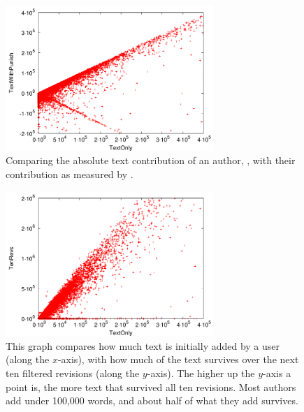 \begin{figure}[tbhp]
    \begin{center}
    \includegraphics[width=0.70\textwidth]{part-I10-contrib/graphs/score-zoom-textonly-textwithpunish}
    \end{center}
    \caption[Comparing abslute text contribution with the punishing measure]{
    	Comparing the absolute text contribution of an author, \textonly,
        with their contribution as measured by \punish.
    }
    \label{fig-zoom-textonly-textwithpunish}
\end{figure}
%
\begin{figure}[tbhp]
    \begin{center}
    \includegraphics[width=0.70\textwidth]{part-I10-contrib/graphs/score-zoom-revisions-textonly}
    \end{center}
    \caption[Measuring short term text survival]{
    	This graph compares how much text is initially added
	by a user (along the $x$-axis), with how much
	of the text survives over the next ten filtered revisions
	(along the $y$-axis).
	The higher up the $y$-axis a point is, the more
	text that survived all ten revisions.
	Most authors add under 100,000 words,
	and about half of what they add survives.
    }
    \label{fig-zoom-revisions-textonly}
\end{figure}
